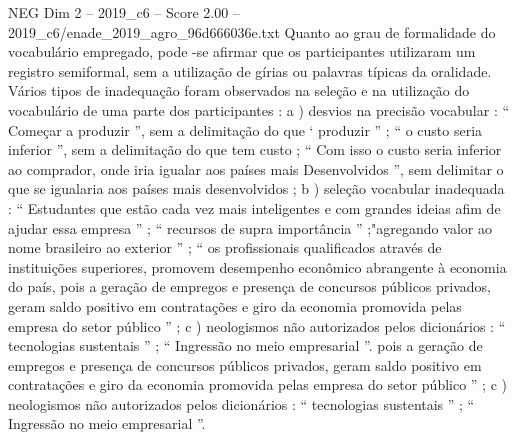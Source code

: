 \begin{textsample}{NEG Dim 2 – 2019\_c6 – Score 2.00 – 2019\_c6/enade\_2019\_agro\_96d666036e.txt}
Quanto ao grau de formalidade do vocabulário empregado, pode -se afirmar que os participantes utilizaram um registro semiformal, sem a utilização de gírias ou palavras típicas da oralidade.
Vários tipos de inadequação foram observados na seleção e na utilização do vocabulário de uma parte dos participantes : a ) desvios na precisão vocabular : “ Começar a produzir ”, sem a delimitação do que ‘ produzir ” ; “ o custo seria inferior ”, sem a delimitação do que tem custo ; “ Com isso o custo seria inferior ao comprador, onde iria igualar aos países mais Desenvolvidos ”, sem delimitar o que se igualaria aos países mais desenvolvidos ; b ) seleção vocabular inadequada : “ Estudantes que estão cada vez mais inteligentes e com grandes ideias afim de ajudar essa empresa ” ; “ recursos de supra importância ” ;"agregando valor ao nome brasileiro ao exterior ” ; “ os profissionais qualificados através de instituições superiores, promovem desempenho econômico abrangente à economia do país, pois a geração de empregos e presença de concursos públicos privados, geram saldo positivo em contratações e giro da economia promovida pelas empresa do setor público ” ; c ) neologismos não autorizados pelos dicionários : “ tecnologias sustentais ” ; “ Ingressão no meio empresarial ”. pois a geração de empregos e presença de concursos públicos privados, geram saldo positivo em contratações e giro da economia promovida pelas empresa do setor público ” ; c ) neologismos não autorizados pelos dicionários : “ tecnologias sustentais ” ; “ Ingressão no meio empresarial ”.

\end{textsample}
